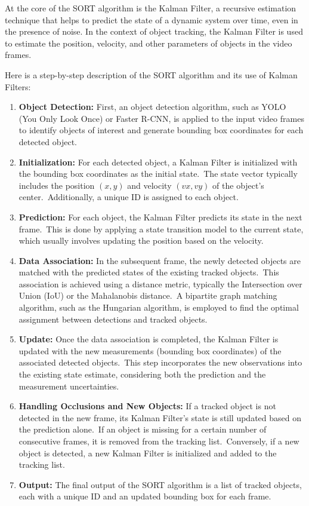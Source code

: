 At the core of the SORT algorithm is the Kalman Filter, a recursive estimation technique that helps to predict the state of a dynamic system over time, even in the presence of noise.
In the context of object tracking, the Kalman Filter is used to estimate the position, velocity, and other parameters of objects in the video frames.

Here is a step-by-step description of the SORT algorithm and its use of Kalman Filters:

\begin{enumerate}
    \item \textbf{Object Detection:} First, an object detection algorithm, such as YOLO (You Only Look Once) or Faster R-CNN, is applied to the input video frames to identify objects of interest and generate bounding box coordinates for each detected object.
    \item \textbf{Initialization:} For each detected object, a Kalman Filter is initialized with the bounding box coordinates as the initial state.\ The state vector typically includes the position $(x, y)$ and velocity $(vx, vy)$ of the object's center.\ Additionally, a unique ID is assigned to each object.
    \item \textbf{Prediction:} For each object, the Kalman Filter predicts its state in the next frame.\ This is done by applying a state transition model to the current state, which usually involves updating the position based on the velocity.
    \item \textbf{Data Association:} In the subsequent frame, the newly detected objects are matched with the predicted states of the existing tracked objects.\ This association is achieved using a distance metric, typically the Intersection over Union (IoU) or the Mahalanobis distance.\ A bipartite graph matching algorithm, such as the Hungarian algorithm, is employed to find the optimal assignment between detections and tracked objects.
    \item \textbf{Update:} Once the data association is completed, the Kalman Filter is updated with the new measurements (bounding box coordinates) of the associated detected objects.\ This step incorporates the new observations into the existing state estimate, considering both the prediction and the measurement uncertainties.
    \item \textbf{Handling Occlusions and New Objects:} If a tracked object is not detected in the new frame, its Kalman Filter's state is still updated based on the prediction alone.\ If an object is missing for a certain number of consecutive frames, it is removed from the tracking list.\ Conversely, if a new object is detected, a new Kalman Filter is initialized and added to the tracking list.
    \item \textbf{Output:} The final output of the SORT algorithm is a list of tracked objects, each with a unique ID and an updated bounding box for each frame.
\end{enumerate}

